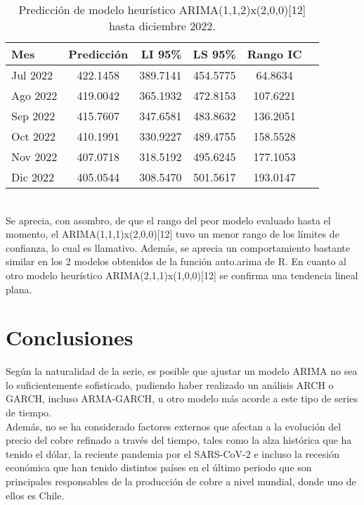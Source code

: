 \documentclass{report}
\begin{document}
\begin{table}[h!]
  \begin{center}
    \label{tab:table1}
    \begin{tabular}{|l|c|r|c|c|c} 
    \hline
      \textbf{Mes} & \textbf{Predicción} & \textbf{LI 95\%} & \textbf{LS 95\%} & \textbf{Rango IC}\\
      \hline
      Jul 2022 & 422.1458 & 389.7141 & 454.5775 & 64.8634\\
      \hline
      Ago 2022 & 419.0042 & 365.1932 & 472.8153 & 107.6221 \\
      \hline
      Sep 2022 & 415.7607 & 347.6581 & 483.8632 & 136.2051 \\
      \hline
      Oct 2022 & 410.1991 & 330.9227 & 489.4755 & 158.5528\\
      \hline
      Nov 2022 & 407.0718 & 318.5192 & 495.6245 & 177.1053\\
      \hline
      Dic 2022 & 405.0544 & 308.5470 & 501.5617 & 193.0147\\
      \hline
    \end{tabular}
  \end{center}
  \caption{Predicción de modelo heurístico ARIMA(1,1,2)x(2,0,0)[12] hasta diciembre 2022.}
\end{table}\\

Se aprecia, con asombro, de que el rango del peor modelo evaluado hasta el momento, el ARIMA(1,1,1)x(2,0,0)[12] tuvo un menor rango de los límites de confianza, lo cual es llamativo. Además, se aprecia un comportamiento bastante similar en los 2 modelos obtenidos de la función auto.arima de R. En cuanto al otro modelo heurístico ARIMA(2,1,1)x(1,0,0)[12] se confirma una tendencia lineal plana.\\





\newpage
\chapter{Conclusiones}\label{Conclusiones}
Según la naturalidad de la serie, es posible que ajustar un modelo ARIMA no sea lo suficientemente sofisticado, pudiendo haber realizado un análisis ARCH o GARCH, incluso ARMA-GARCH, u otro modelo más acorde a este tipo de series de tiempo.\\

Además, no se ha considerado factores externos que afectan a la evolución del precio del cobre refinado a través del tiempo, tales como la alza histórica que ha tenido el dólar, la reciente pandemia por el SARS-CoV-2 e incluso la recesión económica que han tenido distintos países en el último periodo que son principales responsables de la producción de cobre a nivel mundial, donde uno de ellos es Chile.\\
\end{document}
